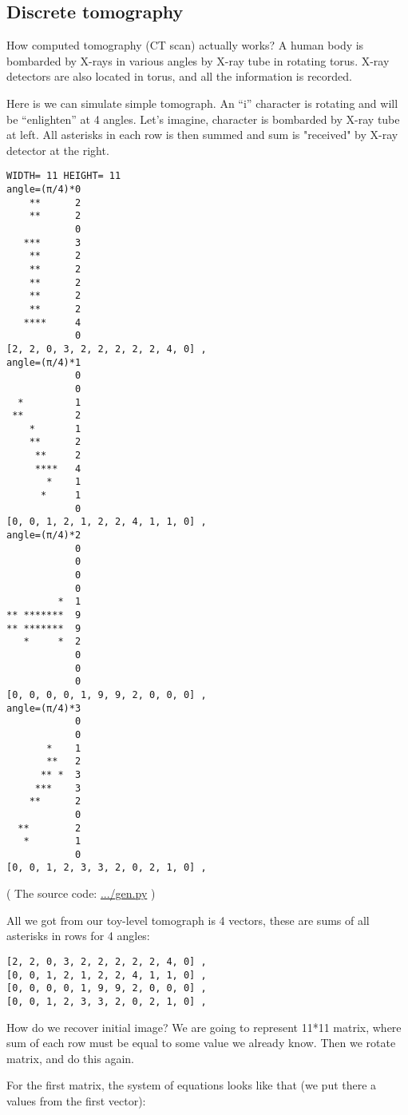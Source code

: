 \subsection{Discrete tomography}

How computed tomography (CT scan) actually works?
A human body is bombarded by X-rays in various angles by X-ray tube in rotating torus.
X-ray detectors are also located in torus, and all the information is recorded.

Here is we can simulate simple tomograph.
An ``i'' character is rotating and will be ``enlighten'' at 4 angles.
Let's imagine, character is bombarded by X-ray tube at left.
All asterisks in each row is then summed and sum is "received" by X-ray detector at the right.

\begin{lstlisting}
WIDTH= 11 HEIGHT= 11
angle=(π/4)*0
    **      2
    **      2
            0
   ***      3
    **      2
    **      2
    **      2
    **      2
    **      2
   ****     4
            0
[2, 2, 0, 3, 2, 2, 2, 2, 2, 4, 0] ,
angle=(π/4)*1
            0
            0
  *         1
 **         2
    *       1
    **      2
     **     2
     ****   4
       *    1
      *     1
            0
[0, 0, 1, 2, 1, 2, 2, 4, 1, 1, 0] ,
angle=(π/4)*2
            0
            0
            0
            0
         *  1
** *******  9
** *******  9
   *     *  2
            0
            0
            0
[0, 0, 0, 0, 1, 9, 9, 2, 0, 0, 0] ,
angle=(π/4)*3
            0
            0
       *    1
       **   2
      ** *  3
     ***    3
    **      2
            0
  **        2
   *        1
            0
[0, 0, 1, 2, 3, 3, 2, 0, 2, 1, 0] ,
\end{lstlisting}

( The source code: \url{.../gen.py} )

All we got from our toy-level tomograph is 4 vectors, these are sums of all asterisks in rows for 4 angles:

\begin{lstlisting}
[2, 2, 0, 3, 2, 2, 2, 2, 2, 4, 0] ,
[0, 0, 1, 2, 1, 2, 2, 4, 1, 1, 0] ,
[0, 0, 0, 0, 1, 9, 9, 2, 0, 0, 0] ,
[0, 0, 1, 2, 3, 3, 2, 0, 2, 1, 0] ,
\end{lstlisting}

How do we recover initial image?
We are going to represent 11*11 matrix, where sum of each row must be equal to some value we already know.
Then we rotate matrix, and do this again.

For the first matrix, the system of equations looks like that (we put there a values from the first vector):

